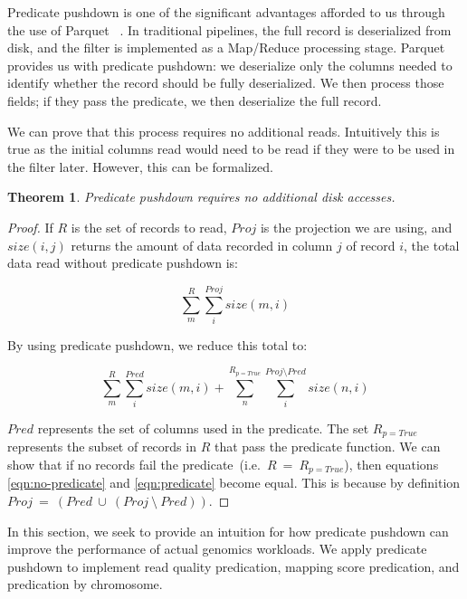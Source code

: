 \documentclass[10pt,twocolumn]{article}
\theoremstyle{plain}
\begin{document}
Predicate pushdown is one of the significant advantages afforded to us through the use of Parquet	~\cite{parquet}. In traditional
pipelines, the full record is deserialized from disk, and the filter is implemented as a Map/Reduce processing stage. Parquet provides
us with predicate pushdown: we deserialize only the columns needed to identify whether the record should be fully deserialized. We
then process those fields; if they pass the predicate, we then deserialize the full record.

We can prove that this process requires no additional reads. Intuitively this is true as the initial columns read would need to be read
if they were to be used in the filter later. However, this can be formalized.

\newtheorem{predicate-read-conserving}{Theorem}

\begin{predicate-read-conserving}
Predicate pushdown requires no additional disk accesses.
\end{predicate-read-conserving}

\begin{proof}

If $R$ is the set of records to read, $Proj$ is the projection we are using, and $size(i,j)$ returns the amount
of data recorded in column $j$ of record $i$, the total data read without predicate pushdown is:

\begin{equation}
\label{eqn:no-predicate}
\sum_{m}^{R}{\sum_{i}^{Proj}size(m,i)}
\end{equation}

By using predicate pushdown, we reduce this total to:

\begin{equation}
\label{eqn:predicate}
\sum_{m}^{R}{\sum_{i}^{Pred}size(m,i)} + \sum_{n}^{R_{p=True}}{\sum_{i}^{Proj \setminus Pred}size(n,i)}
\end{equation}

$Pred$ represents the set of columns used in the predicate. The set $R_{p=True}$ represents the subset of records in $R$ that pass
the predicate function. We can show that  if no records fail the predicate~(i.e.~$R~=~R_{p=True}$), then equations \ref{eqn:no-predicate}
and \ref{eqn:predicate} become equal. This is because by definition $Proj~=~(Pred~\cup~(Proj~\setminus~Pred))$.

\end{proof}

In this section, we seek to provide an intuition for how predicate pushdown can improve the performance of actual genomics workloads.
We apply predicate pushdown to implement read quality predication, mapping score predication, and predication by chromosome. 
\end{document}
